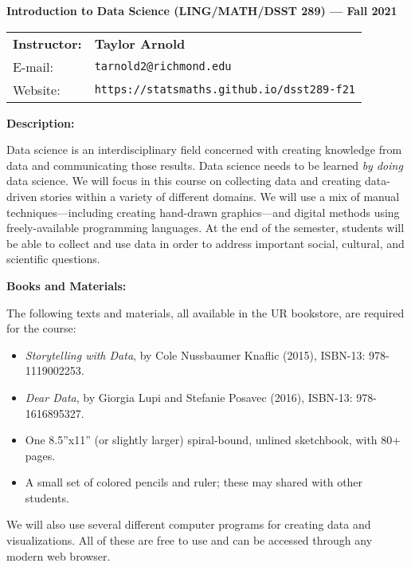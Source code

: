 \documentclass[11pt, a4paper]{article}
\begin{document}
\begin{center}
\textbf{Introduction to Data Science (LING/MATH/DSST 289) --- Fall 2021}
\end{center}

\noindent
\begin{tabular}{ l l }
\textbf{Instructor:} &  \textbf{Taylor Arnold} \\
E-mail: & \texttt{tarnold2@richmond.edu} \\
Website: & \texttt{https://statsmaths.github.io/dsst289-f21}
\end{tabular}

\vspace{0.5cm}

\textbf{Description:} \vspace{6pt}

Data science is an interdisciplinary field concerned with creating knowledge
from data and communicating those results. Data
science needs to be learned \textit{by doing} data science. We
will focus in this course on collecting data and creating data-driven stories
within a variety of different domains. We will use a mix of
manual techniques---including creating hand-drawn graphics---and digital methods
using freely-available programming languages. At the end of the
semester, students will be able to collect and use data in order to address
important social, cultural, and scientific questions.

\bigskip

\textbf{Books and Materials:} \vspace{6pt}

The following texts and materials, all available in the UR bookstore, are
required for the course:

\begin{itemize}
\setlength\itemsep{-0.25em}
\item \textit{Storytelling with Data}, by Cole Nussbaumer Knaflic (2015),
ISBN-13: 978-1119002253.
\item \textit{Dear Data}, by Giorgia Lupi and Stefanie Posavec (2016),
ISBN-13: 978-1616895327.
\item One 8.5''x11'' (or slightly larger) spiral-bound, unlined sketchbook,
with 80+ pages.
\item A small set of colored pencils and ruler; these may shared with other
students.
\end{itemize}

We will also use several different computer programs for creating data and
visualizations. All of these are free to use and can be accessed through any
modern web browser.
\end{document}

